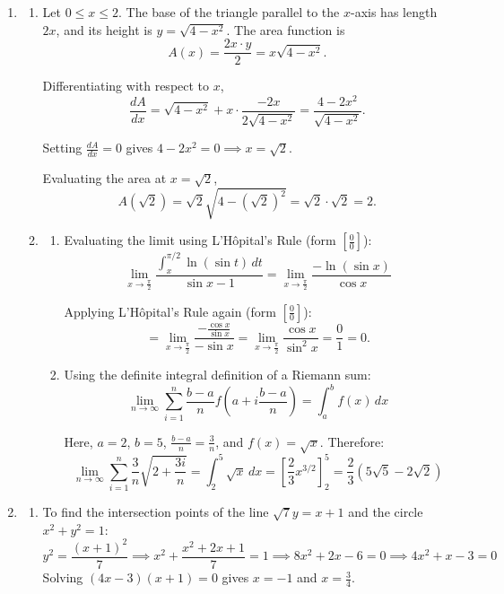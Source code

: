 \documentclass[a4paper, 12pt]{article}
\begin{document}
\begin{enumerate}[leftmargin=*,label=\textbf{\arabic*.}]

\item \begin{enumerate}[leftmargin=*,label=\textbf{\alph*.}]
\item Let $0 \le x \le 2$. The base of the triangle parallel to the $x$-axis has length $2x$, and its height is $y = \sqrt{4-x^2}$. The area function is
\[A(x)=\frac{2x\cdot y}{2}=x\sqrt{4-x^2}.\]

Differentiating with respect to $x$,
\[\frac{dA}{dx}=\sqrt{4-x^2}+x\cdot\frac{-2x}{2\sqrt{4-x^2}}=\frac{4-2x^2}{\sqrt{4-x^2}}.\]

Setting $\frac{dA}{dx}=0$ gives $4-2x^2=0\implies x=\sqrt{2}$.

Evaluating the area at $x = \sqrt{2}$,
\[A\left(\sqrt{2}\right)=\sqrt{2}\sqrt{4-\left(\sqrt2\right)^2}=\sqrt2\cdot\sqrt{2}=\boxed2.\]

\item \begin{enumerate}[leftmargin=*,label=\textbf{\roman*.}]
\item Evaluating the limit using L'Hôpital's Rule (form $\left[\frac{0}{0}\right]$):
\[\lim_{x \to \frac{\pi}{2}} \frac{\int_{x}^{\pi/2} \ln(\sin t) \, dt}{\sin x - 1} = \lim_{x \to \frac{\pi}{2}} \frac{-\ln(\sin x)}{\cos x}\]

Applying L'Hôpital's Rule again (form $\left[\frac{0}{0}\right]$):
\[=\lim_{x\to\frac{\pi}{2}}\frac{-\frac{\cos x}{\sin x}}{-\sin x}=\lim_{x\to\frac{\pi}{2}} \frac{\cos x}{\sin^2 x}=\frac{0}{1}=\boxed0.\]

\item Using the definite integral definition of a Riemann sum:
\[\lim_{n \to \infty} \sum_{i=1}^{n} \frac{b-a}{n} f\left(a + i \frac{b-a}{n}\right) = \int_{a}^{b} f(x) \, dx\]

Here, $a=2$, $b=5$, $\frac{b-a}{n}=\frac{3}{n}$, and $f(x)=\sqrt{x}$. Therefore:
\[\lim_{n \to \infty}\sum_{i=1}^{n}\frac{3}{n}\sqrt{2+\frac{3i}{n}}=\int_{2}^{5}\sqrt{x}\,dx=\left[\frac{2}{3}x^{3/2}\right]_{2}^{5}=\boxed{\frac{2}{3}\left(5\sqrt5-2\sqrt2\right)}\]
\end{enumerate}
\end{enumerate}

\item \begin{enumerate}[leftmargin=*,label=\textbf{\alph*.}]

\item To find the intersection points of the line $\sqrt{7}y = x+1$ and the circle $x^2 + y^2 = 1$:
\[y^2 = \frac{(x+1)^2}{7} \implies x^2 + \frac{x^2 + 2x + 1}{7} = 1 \implies 8x^2 + 2x - 6 = 0 \implies 4x^2 + x - 3 = 0\]
Solving $(4x-3)(x+1) = 0$ gives $x = -1$ and $x = \frac{3}{4}$.


\end{enumerate}
\end{enumerate}
\end{document}

